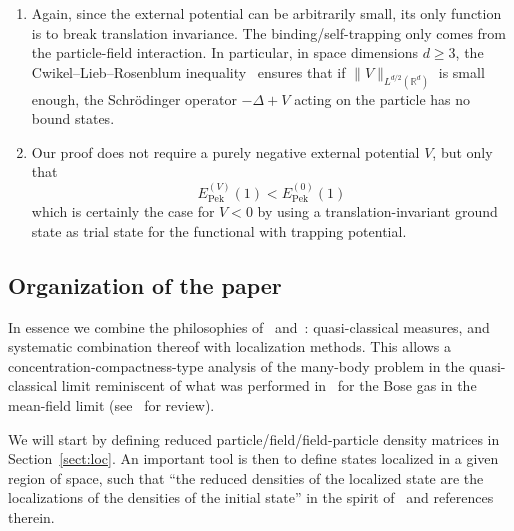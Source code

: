 \documentclass[10pt]{amsart}
\theoremstyle{definition}\newtheorem{defi}[theo]{Definition}\newtheorem{rema}[theo]{Remark}\newtheorem{exam}[theo]{Example}\newtheorem{exem}[theo]{Example}\newtheorem{nota}[theo]{Notation}
\DeclareMathOperator{\Pek}{Pek}
\newcommand{\R}{\mathbb{R}}
\newcommand{\cN}{\mathcal{N}}
\newcommand{\1}{\mathds{1}}
\let\originalleft\left
\let\originalright\right
\renewcommand{\left}{\mathopen{}\mathclose\bgroup\originalleft}
\renewcommand{\right}{\aftergroup\egroup\originalright}
\begin{document}
\begin{enumerate}
\begin{equation*}
\left\langle \Psi_\alpha \,|\, \cN^\kappa \Psi_\alpha \right\rangle \leq C_\kappa
\end{equation*}
independently of $\alpha$, we can allow for $k+\ell \leq 2 \kappa$ in the main result. If $\Psi_\alpha$ is a true eigenstate of the Hamiltonian (assuming such exist), estimates of this form follow from the variational equation and so-called pull-through formulae~\cite{Ammari-00,Rosen-71}.
\item\label{commenttheo2.3.4} Again, since the external potential can be arbitrarily small, its only function is to break translation invariance. The binding/self-trapping only comes from the particle-field interaction. In particular, in space dimensions $d\geq 3$, the Cwikel--Lieb--Rosenblum inequality~\cite[Chapter~4 and references therein]{LieSei-09} ensures that if $\| V\|_{L^{d/2} (\R^d)}$ is small enough, the Schr\"odinger operator $-\Delta + V$ acting on the particle has no bound states.
\item\label{commenttheo2.3.5} Our proof does not require a purely negative external potential $V$, but only that
\begin{equation*}
E_{\Pek}^{(V)}(1) < E_{\Pek}^{(0)}(1)
\end{equation*}
which is certainly the case for $V < 0$ by using a translation-invariant ground state as trial state for the functional with trapping potential.
\end{enumerate}



\subsection{Organization of the paper}

In essence we combine the philosophies of~\cite{CorFalOli-20} and~\cite{LewNamRou-14,LewNamRou-14d}: quasi-classical measures, and systematic combination thereof with localization methods. This allows a concentration-compactness-type analysis of the many-body problem in the quasi-classical limit reminiscent of what was performed in~\cite{LewNamRou-14} for the Bose gas in the mean-field limit (see~\cite{Rougerie-LMU,Rougerie-EMS} for review).

We will start by defining reduced particle/field/field-particle density matrices in Section~\ref{sect:loc}. An important tool is then to define states localized in a given region of space, such that ``the reduced densities of the localized state are the localizations of the densities of the initial state'' in the spirit of~\cite{Lewin-11} and references therein.
\end{document}
